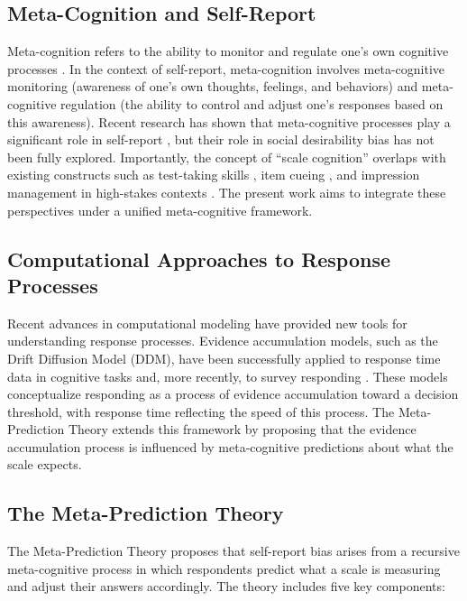 \documentclass[10pt,twocolumn]{article}
\begin{document}
\subsection{Meta-Cognition and Self-Report}

Meta-cognition refers to the ability to monitor and regulate one's own cognitive processes \citep{Flavell1979}. In the context of self-report, meta-cognition involves meta-cognitive monitoring (awareness of one's own thoughts, feelings, and behaviors) and meta-cognitive regulation (the ability to control and adjust one's responses based on this awareness). Recent research has shown that meta-cognitive processes play a significant role in self-report \citep{Paulhus2002}, but their role in social desirability bias has not been fully explored. Importantly, the concept of ``scale cognition'' overlaps with existing constructs such as test-taking skills \citep{Goffin2003}, item cueing \citep{McFarland2000}, and impression management in high-stakes contexts \citep{Griffith2007}. The present work aims to integrate these perspectives under a unified meta-cognitive framework.

\subsection{Computational Approaches to Response Processes}

Recent advances in computational modeling have provided new tools for understanding response processes. Evidence accumulation models, such as the Drift Diffusion Model (DDM), have been successfully applied to response time data in cognitive tasks \citep{Ratcliff1978, Ratcliff2008} and, more recently, to survey responding \citep{Vandekerckhove2007}. These models conceptualize responding as a process of evidence accumulation toward a decision threshold, with response time reflecting the speed of this process. The Meta-Prediction Theory extends this framework by proposing that the evidence accumulation process is influenced by meta-cognitive predictions about what the scale expects.

\subsection{The Meta-Prediction Theory}

The Meta-Prediction Theory proposes that self-report bias arises from a recursive meta-cognitive process in which respondents predict what a scale is measuring and adjust their answers accordingly. The theory includes five key components:
\end{document}
